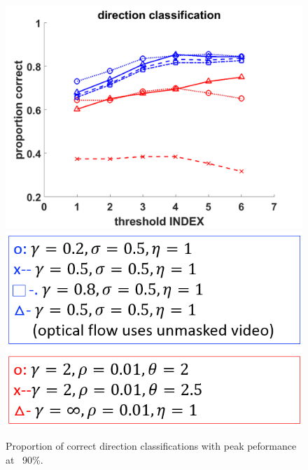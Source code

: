 \documentclass[12pt,oneside]{article} %
\begin{document}
\begin{figure}[!htb]
\centering
\includegraphics[scale=0.4]{images/dirClass.png}
\includegraphics[scale=0.4]{images/legend.png}
\caption{Proportion of correct direction classifications with peak peformance at ~90\%.}
\label{dirclass}
\end{figure}
\end{document}
